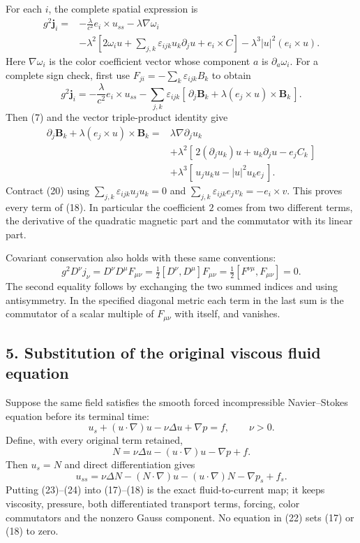 \documentclass[
  11pt,
]{article}
\begin{document}
For each \(i\), the complete spatial expression is \[
 \begin{aligned}
 g^2\mathbf j_i={}&-\frac{\lambda}{c^2}e_i\times u_{ss}
                  -\lambda\nabla\omega_i\\
 &-\lambda^2\left[
       2\omega_i u+
       \sum_{j,k}\varepsilon_{ijk}u_k\partial_j u+
       e_i\times C\right]
       -\lambda^3|u|^2(e_i\times u).
 \end{aligned}
 \tag{18}
\] Here \(\nabla\omega_i\) is the color coefficient vector whose
component \(a\) is \(\partial_a\omega_i\). For a complete sign check,
first use \(F_{ji}=-\sum_k\varepsilon_{ijk}B_k\) to obtain \[
 g^2\mathbf j_i=
 -\frac{\lambda}{c^2}e_i\times u_{ss}
 -\sum_{j,k}\varepsilon_{ijk}
       [\,\partial_j\mathbf B_k+
               \lambda(e_j\times u)\times\mathbf B_k\,].
 \tag{19}
\] Then (7) and the vector triple-product identity give \[
 \begin{aligned}
 \partial_j\mathbf B_k+\lambda(e_j\times u)\times\mathbf B_k
 ={}&\lambda\nabla\partial_j u_k\\
 &+\lambda^2[\,2(\partial_j u_k)u+
                u_k\partial_j u-e_j C_k\,]\\
 &+\lambda^3[\,u_j u_k u-|u|^2u_k e_j\,].
 \end{aligned}
 \tag{20}
\] Contract (20) using \(\sum_{j,k}\varepsilon_{ijk}u_j u_k=0\) and
\(\sum_{j,k}\varepsilon_{ijk}e_jv_k=-e_i\times v\). This proves every
term of (18). In particular the coefficient \(2\) comes from two
different terms, the derivative of the quadratic magnetic part and the
commutator with its linear part.

Covariant conservation also holds with these same conventions: \[
 g^2D^\nu j_\nu
 =D^\nu D^\mu F_{\mu\nu}
 =\tfrac12[D^\nu,D^\mu]F_{\mu\nu}
 =\tfrac12[F^{\nu\mu},F_{\mu\nu}]=0.
 \tag{21}
\] The second equality follows by exchanging the two summed indices and
using antisymmetry. In the specified diagonal metric each term in the
last sum is the commutator of a scalar multiple of \(F_{\mu\nu}\) with
itself, and vanishes.

\subsection{5. Substitution of the original viscous fluid
equation}\label{weak-coupling-part-18-substitution-of-the-original-viscous-fluid-equation}

Suppose the same field satisfies the smooth forced incompressible
Navier--Stokes equation before its terminal time: \[
 u_s+(u\cdot\nabla)u-\nu\Delta u+\nabla p=f,\qquad \nu>0.
 \tag{22}
\] Define, with every original term retained, \[
 N=\nu\Delta u-(u\cdot\nabla)u-\nabla p+f.
 \tag{23}
\] Then \(u_s=N\) and direct differentiation gives \[
 u_{ss}=\nu\Delta N-(N\cdot\nabla)u-(u\cdot\nabla)N
                       -\nabla p_s+f_s.
 \tag{24}
\] Putting (23)--(24) into (17)--(18) is the exact fluid-to-current map;
it keeps viscosity, pressure, both differentiated transport terms,
forcing, color commutators and the nonzero Gauss component. No equation
in (22) sets (17) or (18) to zero.
\end{document}
